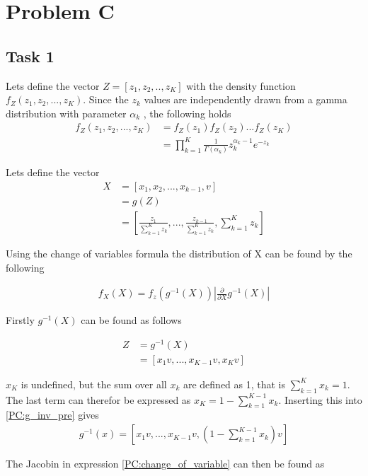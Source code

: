 \section{Problem C}
\subsection{Task 1}
Lets define the vector $Z = [z_1,z_2,..,z_K]$ with the density function $f_Z(z_1,z_2,...,z_K)$. Since the $z_k$ values are independently drawn from a gamma distribution with parameter $\alpha_k$ , the following holds
\begin{align}
    f_Z(z_1,z_2,...,z_K) &= f_Z(z_1) f_Z(z_2) ... f_Z(z_K) \\
    &= \prod_{k=1}^K \frac{1}{\Gamma(\alpha_k)} z_k^{\alpha_k -1} e^{-z_k}
\end{align}

Lets define the vector
\begin{align}
    X &= [x_1, x_2, ... , x_{k-1}, v]\\
    &= g(Z)\\
    &= \left[ \frac{z_1}{\sum_{k=1}^K z_k}, ... ,\frac{z_{k-1}}{\sum_{k=1}^K z_k},  \sum_{k=1}^K z_k\right]
\end{align}

Using the change of variables formula the distribution of X can be found by the following

\begin{align}
    f_X(X) = f_z(g^{-1}(X)) \left| \frac{\partial}{\partial X} g^{-1}(X) \right| \label{PC:change_of_variable}
\end{align}

Firstly $g^{-1}(X)$ can be found as follows

\begin{align}
    Z &= g^{-1}(X)\\
    &= \left[ x_1 v, ... , x_{K-1} v, x_{K} v \right] \label{PC:g_inv_pre}
\end{align}

$x_{K}$ is undefined, but the sum over all $x_k$ are defined as 1, that is $\sum_{k=1}^K x_k=1$. The last term can therefor be expressed as $x_K = 1 - \sum_{k=1}^{K-1} x_k$. Inserting this into \ref{PC:g_inv_pre} gives
\begin{align}
    g^{-1}(x) = \left[ x_1 v, ... , x_{K-1} v, \left(1 - \sum_{k=1}^{K-1} x_k \right) v \right] \label{g_inv}
\end{align}

The Jacobin in expression \ref{PC:change_of_variable} can then be found as

